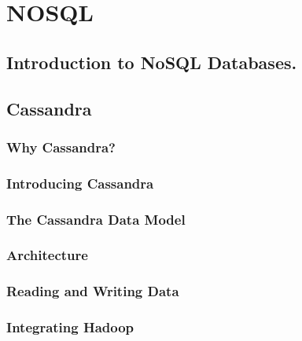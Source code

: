 \section{NOSQL}
\subsection{Introduction to NoSQL Databases.}
\subsection{Cassandra}
\subsubsection{Why Cassandra?}
\subsubsection{Introducing Cassandra}
\subsubsection{The Cassandra Data Model}
\subsubsection{Architecture}
\subsubsection{Reading and Writing Data}
\subsubsection{Integrating Hadoop}
